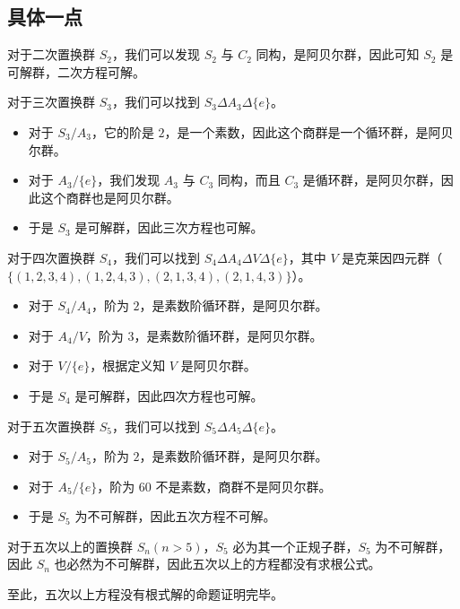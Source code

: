 \documentclass[hyperref,UTF8,12pt,a4paper]{ctexart}
\begin{document}
\subsection{具体一点}

对于二次置换群 $S_2$，我们可以发现 $S_2$ 与 $C_2$ 同构，是阿贝尔群，因此可知 $S_2$ 是可解群，二次方程可解。

对于三次置换群 $S_3$，我们可以找到 $S_3 \Delta A_3 \Delta \{e\}$。

\begin{itemize}
\item 对于 $S_3/A_3$，它的阶是 $2$，是一个素数，因此这个商群是一个循环群，是阿贝尔群。
\item 对于 $A_3/\{e\}$，我们发现 $A_3$ 与 $C_3$ 同构，而且 $C_3$ 是循环群，是阿贝尔群，因此这个商群也是阿贝尔群。
\item 于是 $S_3$ 是可解群，因此三次方程也可解。
\end{itemize}

对于四次置换群 $S_4$，我们可以找到 $S_4 \Delta A_4 \Delta V \Delta \{e\}$，其中 $V$ 是克莱因四元群（$\{(1,2,3,4),(1,2,4,3),(2,1,3,4),(2,1,4,3)\}$）。

\begin{itemize}
\item 对于 $S_4/A_4$，阶为 $2$，是素数阶循环群，是阿贝尔群。
\item 对于 $A_4/V$，阶为 $3$，是素数阶循环群，是阿贝尔群。
\item 对于 $V/\{e\}$，根据定义知 $V$ 是阿贝尔群。
\item 于是 $S_4$ 是可解群，因此四次方程也可解。
\end{itemize}

对于五次置换群 $S_5$，我们可以找到 $S_5 \Delta A_5 \Delta \{e\}$。

\begin{itemize}
\item 对于 $S_5/A_5$，阶为 $2$，是素数阶循环群，是阿贝尔群。
\item 对于 $A_5/\{e\}$，阶为 $60$ 不是素数，商群不是阿贝尔群。
\item 于是 $S_5$ 为不可解群，因此五次方程不可解。
\end{itemize}

对于五次以上的置换群 $S_n(n > 5)$，$S_5$ 必为其一个正规子群，$S_5$ 为不可解群，因此 $S_n$ 也必然为不可解群，因此五次以上的方程都没有求根公式。

至此，五次以上方程没有根式解的命题证明完毕。

\newpage


\end{document}
